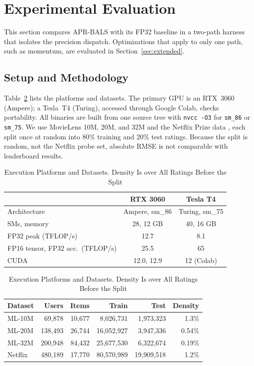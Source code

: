 \section{Experimental Evaluation}
\label{sec:eval}

This section compares APR-BALS with its FP32 baseline in a two-path harness that isolates the precision dispatch. Optimizations that apply to only one path, such as momentum, are evaluated in Section~\ref{sec:extended}.

\subsection{Setup and Methodology}
\label{ssec:setup}

Table~\ref{tab:platforms} lists the platforms and datasets. The primary GPU is an RTX~3060 (Ampere); a Tesla~T4 (Turing), accessed through Google Colab, checks portability. All binaries are built from one source tree with \texttt{nvcc -O3} for \texttt{sm\_86} or \texttt{sm\_75}. We use MovieLens 10M, 20M, and 32M \cite{harper2016movielens} and the Netflix Prize data \cite{bennett2007netflix}, each split once at random into 80\% training and 20\% test ratings. Because the split is random, not the Netflix probe set, absolute RMSE is not comparable with leaderboard results.

\begin{table}[!t]
\caption{Execution Platforms and Datasets. Density Is over All Ratings Before the Split}
\label{tab:platforms}
\centering
\footnotesize
\renewcommand{\arraystretch}{1.05}
\setlength{\tabcolsep}{3pt}
\begin{tabular}{lcc}
\toprule
 & \textbf{RTX 3060} & \textbf{Tesla T4} \\
\midrule
Architecture & Ampere, sm\_86 & Turing, sm\_75 \\
SMs, memory & 28, 12 GB & 40, 16 GB \\
FP32 peak (TFLOP/s) & 12.7 & 8.1 \\
FP16 tensor, FP32 acc.\ (TFLOP/s) & 25.5 & 65 \\
CUDA & 12.0, 12.9 & 12 (Colab) \\
\bottomrule
\end{tabular}

\vspace{4pt}

\setlength{\tabcolsep}{2.5pt}
\begin{tabular}{lrrrrr}
\toprule
\textbf{Dataset} & \textbf{Users} & \textbf{Items} & \textbf{Train} & \textbf{Test} & \textbf{Density} \\
\midrule
ML-10M   & 69{,}878  & 10{,}677 & 8{,}026{,}731  & 1{,}973{,}323 & 1.3\% \\
ML-20M   & 138{,}493 & 26{,}744 & 16{,}052{,}927 & 3{,}947{,}336 & 0.54\% \\
ML-32M   & 200{,}948 & 84{,}432 & 25{,}677{,}530 & 6{,}322{,}674 & 0.19\% \\
Netflix  & 480{,}189 & 17{,}770 & 80{,}570{,}989 & 19{,}909{,}518 & 1.2\% \\
\bottomrule
\end{tabular}
\end{table}

